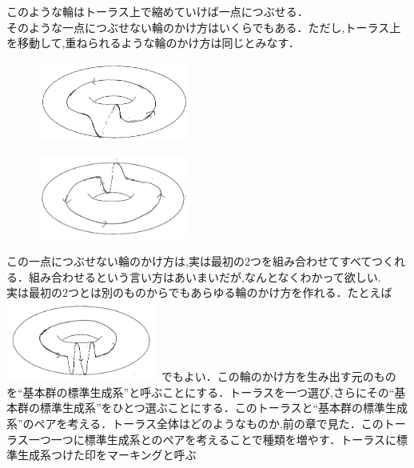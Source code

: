 このような輪はトーラス上で縮めていけば一点につぶせる．\\
そのような一点につぶせない輪のかけ方はいくらでもある．ただし,トーラス上を移動して,重ねられるような輪のかけ方は同じとみなす．\\
\begin{figure}[h]
\begin{minipage}{0.5\hsize}
\includegraphics[width=5cm]{asaka12.png}\\
\end{minipage}
\begin{minipage}{0.5\hsize}
\includegraphics[width=5cm]{asaka121.png}\\
\end{minipage}
\end{figure}
この一点につぶせない輪のかけ方は,実は最初の$2$つを組み合わせてすべてつくれる．組み合わせるという言い方はあいまいだが,なんとなくわかって欲しい.\\
実は最初の$2$つとは別のものからでもあらゆる輪のかけ方を作れる．たとえば\\
\includegraphics[width=5cm]{asaka14.png}
でもよい．この輪のかけ方を生み出す元のものを``基本群の標準生成系''と呼ぶことにする．トーラスを一つ選び,さらにその``基本群の標準生成系''をひとつ選ぶことにする．このトーラスと``基本群の標準生成系''のペアを考える．トーラス全体はどのようなものか,前の章で見た．このトーラス一つ一つに標準生成系とのペアを考えることで種類を増やす．トーラスに標準生成系つけた印をマーキングと呼ぶ\\
